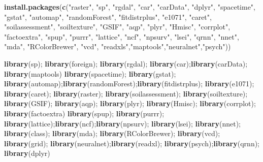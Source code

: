 \documentclass[
  10pt,
  b5paper,
]{book}
\newenvironment{Shaded}{\begin{snugshade}}{\end{snugshade}}
\newcommand{\KeywordTok}[1]{\textcolor[rgb]{0.13,0.29,0.53}{\textbf{#1}}}
\newcommand{\NormalTok}[1]{#1}
\newcommand{\StringTok}[1]{\textcolor[rgb]{0.31,0.60,0.02}{#1}}
\begin{document}
\begin{Shaded}
\begin{Highlighting}[]
\KeywordTok{install.packages}\NormalTok{(}\KeywordTok{c}\NormalTok{(}\StringTok{"raster"}\NormalTok{, }\StringTok{"sp"}\NormalTok{, }\StringTok{"rgdal"}\NormalTok{, }\StringTok{"car"}\NormalTok{, }\StringTok{"carData"}\NormalTok{, }\StringTok{"dplyr"}\NormalTok{, }\StringTok{"spacetime"}\NormalTok{, }\StringTok{"gstat"}\NormalTok{, }\StringTok{"automap"}\NormalTok{, }\StringTok{"randomForest"}\NormalTok{, }\StringTok{"fitdistrplus"}\NormalTok{, }\StringTok{"e1071"}\NormalTok{, }\StringTok{"caret"}\NormalTok{, }\StringTok{"soilassessment"}\NormalTok{, }\StringTok{"soiltexture"}\NormalTok{, }\StringTok{"GSIF"}\NormalTok{, }\StringTok{"aqp"}\NormalTok{, }\StringTok{"plyr"}\NormalTok{, }
                   \StringTok{"Hmisc"}\NormalTok{, }\StringTok{"corrplot"}\NormalTok{, }\StringTok{"factoextra"}\NormalTok{, }\StringTok{"spup"}\NormalTok{, }\StringTok{"purrr"}\NormalTok{, }\StringTok{"lattice"}\NormalTok{, }\StringTok{"ncf"}\NormalTok{, }\StringTok{"npsurv"}\NormalTok{, }\StringTok{"lsei"}\NormalTok{,}
                   \StringTok{"qrnn"}\NormalTok{, }\StringTok{"nnet"}\NormalTok{, }\StringTok{"mda"}\NormalTok{, }\StringTok{"RColorBrewer"}\NormalTok{, }\StringTok{"vcd"}\NormalTok{, }\StringTok{"readxls"}\NormalTok{,}\StringTok{"maptools"}\NormalTok{,}\StringTok{"neuralnet"}\NormalTok{,}\StringTok{"psych"}\NormalTok{))}

\KeywordTok{library}\NormalTok{(sp); }\KeywordTok{library}\NormalTok{(foreign); }\KeywordTok{library}\NormalTok{(rgdal); }\KeywordTok{library}\NormalTok{(car);}\KeywordTok{library}\NormalTok{(carData); }\KeywordTok{library}\NormalTok{(maptools) }\KeywordTok{library}\NormalTok{(spacetime); }\KeywordTok{library}\NormalTok{(gstat); }\KeywordTok{library}\NormalTok{(automap);}\KeywordTok{library}\NormalTok{(randomForest);}\KeywordTok{library}\NormalTok{(fitdistrplus); }
\KeywordTok{library}\NormalTok{(e1071); }\KeywordTok{library}\NormalTok{(caret); }\KeywordTok{library}\NormalTok{(raster); }\KeywordTok{library}\NormalTok{(soilassessment); }\KeywordTok{library}\NormalTok{(soiltexture); }
\KeywordTok{library}\NormalTok{(GSIF); }\KeywordTok{library}\NormalTok{(aqp); }\KeywordTok{library}\NormalTok{(plyr); }\KeywordTok{library}\NormalTok{(Hmisc); }\KeywordTok{library}\NormalTok{(corrplot); }\KeywordTok{library}\NormalTok{(factoextra) }
\KeywordTok{library}\NormalTok{(spup); }\KeywordTok{library}\NormalTok{(purrr); }\KeywordTok{library}\NormalTok{(lattice);}\KeywordTok{library}\NormalTok{(ncf);}\KeywordTok{library}\NormalTok{(npsurv); }\KeywordTok{library}\NormalTok{(lsei); }
\KeywordTok{library}\NormalTok{(nnet); }\KeywordTok{library}\NormalTok{(class); }\KeywordTok{library}\NormalTok{(mda); }\KeywordTok{library}\NormalTok{(RColorBrewer); }\KeywordTok{library}\NormalTok{(vcd); }\KeywordTok{library}\NormalTok{(grid); }\KeywordTok{library}\NormalTok{(neuralnet);}\KeywordTok{library}\NormalTok{(readxl); }\KeywordTok{library}\NormalTok{(psych);}\KeywordTok{library}\NormalTok{(qrnn); }\KeywordTok{library}\NormalTok{(dplyr)}
\end{Highlighting}
\end{Shaded}
\end{document}
